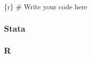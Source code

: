 \documentclass[
  letterpaper,
  DIV=11,
  numbers=noendperiod,
  oneside]{scrreprt}
\newenvironment{Shaded}{\begin{snugshade}}{\end{snugshade}}
\newcommand{\CommentTok}[1]{\textcolor[rgb]{0.37,0.37,0.37}{#1}}
\newcommand{\InformationTok}[1]{\textcolor[rgb]{0.37,0.37,0.37}{#1}}
\begin{document}
\begin{Shaded}
\begin{Highlighting}[]
\InformationTok{\textasciigrave{}\textasciigrave{}\textasciigrave{}\{r\}}
\CommentTok{\# Write your code here}
\InformationTok{\textasciigrave{}\textasciigrave{}\textasciigrave{}}
\end{Highlighting}
\end{Shaded}

\hypertarget{stata-6}{%
\subsubsection{Stata}\label{stata-6}}

\hypertarget{r-6}{%
\subsubsection{R}\label{r-6}}
\end{document}
